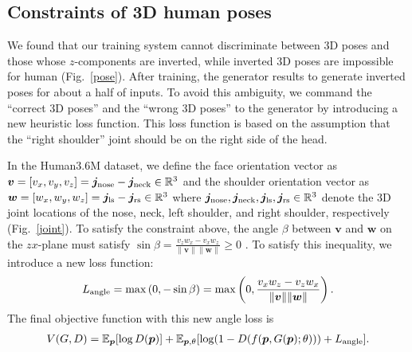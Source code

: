 \documentclass[runningheads]{llncs}
\newcommand{\Fref}[1]{Fig.~\ref{#1}}
\begin{document}
\subsection{Constraints of 3D human poses}
We found that our training system cannot discriminate between 3D poses and those whose $z$-components are inverted, while inverted 3D poses are impossible for human (\Fref{pose}).
After training, the generator results to generate inverted poses for about a half of inputs.
To avoid this ambiguity, we command the ``correct 3D poses'' and the ``wrong 3D poses'' to the generator by introducing a new heuristic loss function.
This loss function is based on the assumption that the ``right shoulder'' joint should be on the right side of the head.

In the Human3.6M dataset, we define the face orientation vector as ${\bm v} = [v_x, v_y, v_z] = {\bm j}_{\rm{nose}} - {\bm j}_{\rm{neck}} \in \mathbb{R}^3$ and the shoulder orientation vector as ${\bm w} = [w_x, w_y, w_z] ={\bm j}_{\rm{ls}} - {\bm j}_{\rm{rs}} \in \mathbb{R}^3$ where ${\bm j}_{\rm{nose}}, {\bm j}_{\rm{neck}}, {\bm j}_{\rm{ls}}, {\bm j}_{\rm{rs}} \in \mathbb{R}^3$ denote the 3D joint locations of the nose, neck, left shoulder, and right shoulder, respectively (\Fref{joint}).
To satisfy the constraint above, the angle $\beta$ between ${\bm v}$ and ${\bm w}$ on the $zx$-plane must satisfy $\sin \beta = \frac{v_z w_x - v_x w_z}{{\| {\bm v} \| \| {\bm w} \| }} \geq 0$ .
To satisfy this inequality, we introduce a new loss function:
\begin{eqnarray}
L_{\rm angle} = \max \left( 0, -\sin \beta \right) = \max \left( 0, \frac{v_x w_z - v_z w_x}{{\| {\bm v} \| \| {\bm w} \| }} \right).
\end{eqnarray}
The final objective function with this new angle loss is
\begin{eqnarray}
V(G, D) = \mathbb{E}_{\bm p}[\log D({\bm p})] + \mathbb{E}_{{\bm p}, \theta}[\log (1 - D(f({\bm p}, G({\bm p}); \theta)))+L_{\rm angle}].
\end{eqnarray}
\end{document}
